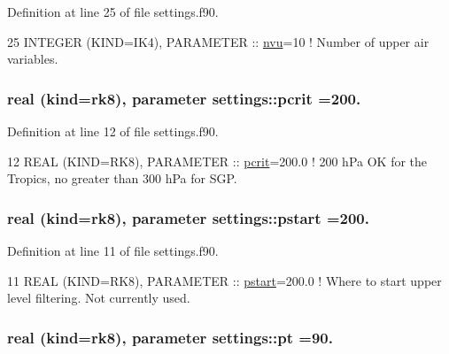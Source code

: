 Definition at line 25 of file settings.\+f90.


\begin{DoxyCode}
25 \textcolor{keywordtype}{INTEGER (KIND=IK4)}, \textcolor{keywordtype}{PARAMETER}   :: \hyperlink{namespacesettings_a79e2ff19d589b215ed9176906dd5cbbf}{nvu}=10                   \textcolor{comment}{! Number of upper air variables.}
\end{DoxyCode}
\subsubsection[{\texorpdfstring{pcrit}{pcrit}}]{\setlength{\rightskip}{0pt plus 5cm}real (kind=rk8), parameter settings\+::pcrit =200.}\hypertarget{namespacesettings_a8d5e7d0c921e46fc4b2c7d7738729805}{}\label{namespacesettings_a8d5e7d0c921e46fc4b2c7d7738729805}


Definition at line 12 of file settings.\+f90.


\begin{DoxyCode}
12 \textcolor{keywordtype}{REAL    (KIND=RK8)}, \textcolor{keywordtype}{PARAMETER}   :: \hyperlink{namespacesettings_a8d5e7d0c921e46fc4b2c7d7738729805}{pcrit}=200.0              \textcolor{comment}{! 200 hPa OK for the Tropics, no greater
       than 300 hPa for SGP.}
\end{DoxyCode}
\subsubsection[{\texorpdfstring{pstart}{pstart}}]{\setlength{\rightskip}{0pt plus 5cm}real (kind=rk8), parameter settings\+::pstart =200.}\hypertarget{namespacesettings_a80b5ece3c388ad5e0c924f372afebe65}{}\label{namespacesettings_a80b5ece3c388ad5e0c924f372afebe65}


Definition at line 11 of file settings.\+f90.


\begin{DoxyCode}
11 \textcolor{keywordtype}{REAL    (KIND=RK8)}, \textcolor{keywordtype}{PARAMETER}   :: \hyperlink{namespacesettings_a80b5ece3c388ad5e0c924f372afebe65}{pstart}=200.0             \textcolor{comment}{! Where to start upper level filtering.
       Not currently used.}
\end{DoxyCode}
\subsubsection[{\texorpdfstring{pt}{pt}}]{\setlength{\rightskip}{0pt plus 5cm}real (kind=rk8), parameter settings\+::pt =90.}\hypertarget{namespacesettings_ac94cc887999dc993bb580baf0ce85ce3}{}\label{namespacesettings_ac94cc887999dc993bb580baf0ce85ce3}


